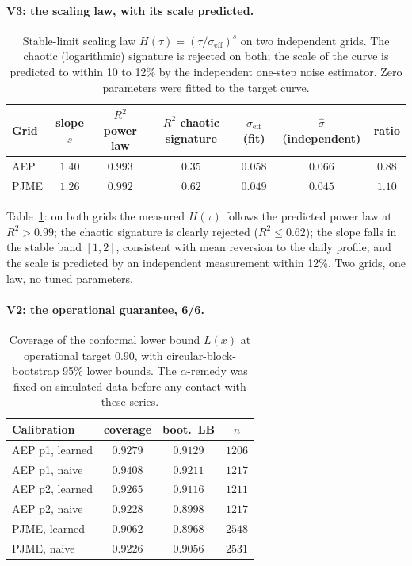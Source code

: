 \documentclass[aps,pre,twocolumn,superscriptaddress,nofootinbib,longbibliography]{revtex4-2}
\newcommand{\eff}{\mathrm{eff}}
\begin{document}
\paragraph{V3: the scaling law, with its scale predicted.}

\begin{table}[t]
\centering
\begin{tabular}{l c c c c c c}
\toprule
Grid & slope $s$ & $R^2$ power law & $R^2$ chaotic signature &
$\sigma_\eff$ (fit) & $\hat\sigma$ (independent) & ratio \\
\midrule
AEP  & $\mathbf{1.40}$ & $\mathbf{0.993}$ & $0.35$ & $0.058$ & $0.066$ &
$\mathbf{0.88}$ \\
PJME & $\mathbf{1.26}$ & $\mathbf{0.992}$ & $0.62$ & $0.049$ & $0.045$ &
$\mathbf{1.10}$ \\
\bottomrule
\end{tabular}
\caption{Stable-limit scaling law $H(\tau) = (\tau/\sigma_\eff)^s$ on two
independent grids. The chaotic (logarithmic) signature is rejected on
both; the scale of the curve is predicted to within 10 to 12\% by the
independent one-step noise estimator. Zero parameters were fitted to the
target curve.}
\label{tab:scaling}
\end{table}

Table~\ref{tab:scaling}: on both grids the measured $H(\tau)$ follows the
predicted power law at $R^2 > 0.99$; the chaotic signature is clearly
rejected ($R^2 \le 0.62$); the slope falls in the stable band $[1,2]$,
consistent with mean reversion to the daily profile; and the scale is
predicted by an independent measurement within 12\%. Two grids, one law,
no tuned parameters.

\paragraph{V2: the operational guarantee, 6/6.}

\begin{table}[t]
\centering
\begin{tabular}{l c c c}
\toprule
Calibration & coverage & boot.\ LB & $n$ \\
\midrule
AEP p1, learned & $0.9279$ & $0.9129$ & $1206$ \\
AEP p1, naive   & $0.9408$ & $0.9211$ & $1217$ \\
AEP p2, learned & $0.9265$ & $0.9116$ & $1211$ \\
AEP p2, naive   & $0.9228$ & $0.8998$ & $1217$ \\
PJME, learned   & $0.9062$ & $0.8968$ & $2548$ \\
PJME, naive     & $0.9226$ & $0.9056$ & $2531$ \\
\bottomrule
\end{tabular}
\caption{Coverage of the conformal lower bound $L(x)$ at operational
target $0.90$, with circular-block-bootstrap 95\% lower bounds. The
$\alpha$-remedy was fixed on simulated data before any contact with these
series.}
\label{tab:coverage}
\end{table}
\end{document}
